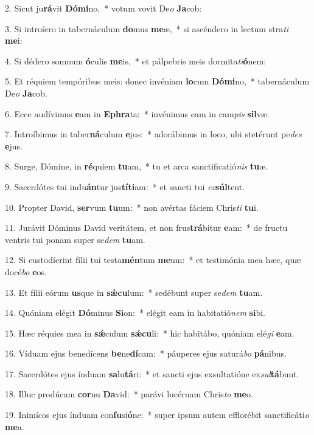 2. Sicut ju\textbf{rá}vit \textbf{Dó}\textbf{mi}no,~*  votum vovit De\textit{o} \textbf{Ja}cob:\

3. Si introíero in tabernáculum \textbf{do}mus \textbf{me}æ,~*  si ascéndero in lectum stra\textit{ti} \textbf{me}i:\

4. Si dédero somnum \textbf{ó}culis \textbf{me}is,~*  et pálpebris meis dormita\textit{ti}\textbf{ó}nem:\

5. Et réquiem tempóribus meis: donec invéniam \textbf{lo}cum \textbf{Dó}\textbf{mi}no,~*  tabernáculum De\textit{o} \textbf{Ja}cob.\

6. Ecce audívimus \textbf{e}am in \textbf{E}\textbf{phra}ta:~*  invénimus eam in cam\textit{pis} \textbf{sil}væ.\

7. Introíbimus in taber\textbf{ná}culum \textbf{e}jus:~*  adorábimus in loco, ubi stetérunt pe\textit{des} \textbf{e}jus.\

8. Surge, Dómine, in \textbf{ré}quiem \textbf{tu}am,~*  tu et arca sanctificatió\textit{nis} \textbf{tu}æ.\

9. Sacerdótes tui indu\textbf{án}tur jus\textbf{tí}\textbf{ti}am:~*  et sancti tui \textit{ex}\textbf{súl}tent.\

10. Propter David, \textbf{ser}vum \textbf{tu}um:~*  non avértas fáciem Chris\textit{ti} \textbf{tu}i.\

11. Jurávit Dóminus David veritátem, et non frus\textbf{trá}bitur \textbf{e}am:~*  de fructu ventris tui ponam super se\textit{dem} \textbf{tu}am.\

12. Si custodíerint fílii tui testa\textbf{mén}tum \textbf{me}um:~*  et testimónia mea hæc, quæ docé\textit{bo} \textbf{e}os.\

13. Et fílii eórum \textbf{us}que in \textbf{sǽ}\textbf{cu}lum:~*  sedébunt super se\textit{dem} \textbf{tu}am.\

14. Quóniam elégit \textbf{Dó}minus \textbf{Si}on:~*  elégit eam in habitatió\textit{nem} \textbf{si}bi.\

15. Hæc réquies mea in \textbf{sǽ}culum \textbf{sǽ}\textbf{cu}li:~*  hic habitábo, quóniam elé\textit{gi} \textbf{e}am.\

16. Víduam ejus benedícens \textbf{be}ne\textbf{dí}cam:~*  páuperes ejus saturá\textit{bo} \textbf{pá}nibus.\

17. Sacerdótes ejus índuam \textbf{sa}lu\textbf{tá}ri:~*  et sancti ejus exsultatióne ex\textit{sul}\textbf{tá}bunt.\

18. Illuc prodúcam \textbf{cor}nu \textbf{Da}vid:~*  parávi lucérnam Chris\textit{to} \textbf{me}o.\

19. Inimícos ejus índuam con\textbf{fu}si\textbf{ó}ne:~*  super ipsum autem efflorébit sanctificáti\textit{o} \textbf{me}a.\

